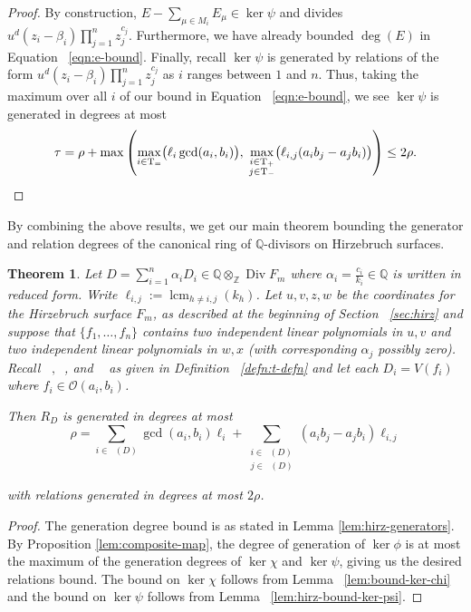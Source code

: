 \documentclass{amsart}
\theoremstyle{plain}
\newtheorem{thm}{Theorem}[subsection]
\theoremstyle{definition}
\theoremstyle{remark}
\newtheorem{rem}[thm]{Remark}
\numberwithin{equation}{subsection}
\newcommand\bq{{\mathbb Q}}
\newcommand\bz{{\mathbb Z}}
\newcommand\sco{{\mathscr O}}
\DeclareMathOperator\di{Div}
\newcommand\bida{a}
\newcommand\bidb{b}
\newcommand\hirz{F}
\DeclareMathOperator{\Te}{T_=}
\DeclareMathOperator{\Tp}{T_+}
\DeclareMathOperator{\Tm}{T_-}
\DeclareMathOperator{\lcm}{lcm}
\begin{document}
\begin{proof}
By construction, $E - \sum_{\mu \in M_i} E_\mu \in \ker \psi$ and
divides $u^d(z_i - \beta_i) \prod_{j = 1}^n z_j^{c_j}$. 
Furthermore, we have already bounded $\deg(E)$ in Equation ~\eqref{eqn:e-bound}.
Finally, recall $\ker \psi$ is generated by relations of the form $u^d(z_i - \beta_i) \prod_{j = 1}^n z_j^{c_j}$ as
$i$ ranges between $1$ and $n$. Thus, taking the maximum over all $i$ 
of our bound in Equation ~\eqref{eqn:e-bound}, we see $\ker \psi$ is generated in degrees at most
\[
	\tau = \rho
	+ \max \left(\max_{i\in \Te} \bigl(\ell_i \gcd(a_i, b_i) \bigr),
	\; \max_{\substack{i \in \Tp \\ j \in \Tm}} \bigl(\ell_{i, j}
	(\bida_i \bidb_j - \bida_j
	\bidb_i) \bigr) \right)\le 2\rho.
	\qedhere
\]
\end{proof}

By combining the above results, we get our main theorem bounding
the generator and relation degrees of the canonical ring of
$\bq$-divisors on Hirzebruch surfaces.

\begin{thm}
\label{thm:hirz-generators-relations-full}
Let $D = \sum_{i = 1}^n \alpha_i D_i \in \bq
\otimes_\bz \di \hirz_m$ where $\alpha_i = \frac{c_i}{k_i} \in \bq$ is written in reduced form.
Write $\ell_{i,j} := \lcm_{h\ne i,j}(k_h)$.
Let $u, v, z, w$ be the coordinates for the Hirzebruch surface
$\hirz_m$, as described at the beginning of Section
~\ref{sec:hirz} and suppose that $\{f_1, \ldots, f_n\}$
contains two independent 
linear polynomials in $u, v$ and two independent linear polynomials in
$w, x$ {\rm(}with corresponding $\alpha_j$ possibly zero{\rm)}.
Recall $\Te, \Tp$, and $\Tm$ as given in Definition ~\ref{defn:t-defn} and let each $D_i = V(f_i)$ where $f_i \in \sco(a_i, b_i)$.

Then $R_D$ is generated in degrees at most
\[
	\rho = \sum_{i\in \Te(D)} \gcd(\bida_i, \bidb_i)\ell_i +
	\sum_{\substack{i \in \Tp(D) \\	j \in \Tm(D)}} (\bida_i \bidb_j
	- \bida_j \bidb_i) \ell_{i, j}
\]

\noindent
with relations generated in degrees at most $2 \rho$.
\end{thm}
\begin{proof}
The generation degree bound is as stated in Lemma \ref{lem:hirz-generators}.
By Proposition \ref{lem:composite-map}, the degree of generation of
$\ker \phi$ is at most the maximum of the generation degrees of $\ker \chi$
and $\ker \psi$, giving us the desired relations bound. The bound on $\ker \chi$
follows from Lemma ~\ref{lem:bound-ker-chi} and the bound on $\ker \psi$
follows from Lemma ~\ref{lem:hirz-bound-ker-psi}.
\end{proof}
\end{document}
